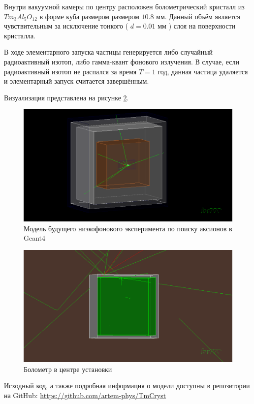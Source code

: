 \documentclass[a4paper,article,14pt]{extarticle}
\begin{document}
Внутри вакуумной камеры по центру расположен болометрический кристалл из $Tm_3Al_5O_{12}$ в форме куба размером размером $ 10.8 \text{ мм}$. Данный объём является чувствительным за исключение тонкого ( $d = 0.01 \text{ мм}$ ) слоя на поверхности кристалла. 

В ходе элементарного запуска частицы генерируется либо случайный радиоактивный изотоп, либо гамма-квант фонового излучения. В случае, если радиоактивный изотоп не распался за время $T = 1 \text{ год}$, данная частица удаляется и элементарный запуск считается завершённым.

Визуализация представлена на рисунке \ref{TmVis}.

\begin{figure}[h]
    \centering
    \includegraphics[width = 0.85 \textwidth]{images/TmCrystVis.png}
    \caption{Модель будущего низкофонового эксперимента по поиску аксионов в Geant4}
    \label{TmVis}
\end{figure}

\begin{figure}[h!]
    \centering
    \includegraphics[width = 0.85 \textwidth]{images/Bolometer.png}
    \caption{Болометр в центре установки}
    \label{TmVis}
\end{figure}


Исходный код, а также подробная информация о модели доступны в репозитории на GitHub: \hyperlink{https://github.com/artem-phys/TmCryst}{https://github.com/artem-phys/TmCryst}
\end{document}
